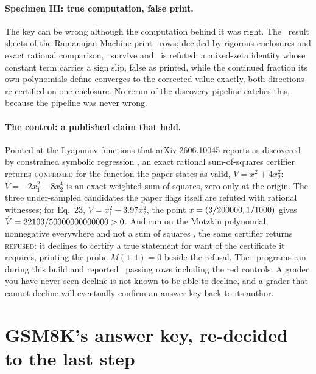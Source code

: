 \documentclass[11pt]{article}
\theoremstyle{definition}
\newcommand{\verdict}[1]{\textsc{#1}}
\begin{document}
\paragraph{Specimen III: true computation, false print.} The key can be wrong although the computation behind it was right. The \RmSheets\ result sheets of the Ramanujan Machine \cite{RM21} print \RmPrinted\ rows; decided by rigorous enclosures and exact rational comparison, \RmSurvive\ survive and \RmRefuted\ is refuted: a mixed-zeta identity whose constant term carries a sign slip, false as printed, while the continued fraction its own polynomials define converges to the corrected value exactly, both directions re-certified on one enclosure. No rerun of the discovery pipeline catches this, because the pipeline was never wrong.

\paragraph{The control: a published claim that held.} Pointed at the Lyapunov functions that arXiv:2606.10045 reports as discovered by constrained symbolic regression \cite{Lyap26}, an exact rational sum-of-squares certifier returns \verdict{confirmed} for the function the paper states as valid, $V=x_1^2+4x_2^2$: $\dot V=-2x_1^2-8x_2^4$ is an exact weighted sum of squares, zero only at the origin. The three under-sampled candidates the paper flags itself are refuted with rational witnesses; for Eq.~23, $V=x_1^2+3.97x_2^2$, the point $x=(3/200000,1/1000)$ gives $\dot V=22103/50000000000000>0$. And run on the Motzkin polynomial, nonnegative everywhere and not a sum of squares \cite{Motzkin67}, the same certifier returns \verdict{refused}: it declines to certify a true statement for want of the certificate it requires, printing the probe $M(1,1)=0$ beside the refusal. The \SosPrograms\ programs ran during this build and reported \SosPass\ passing rows including the red controls. A grader you have never seen decline is not known to be able to decline, and a grader that cannot decline will eventually confirm an answer key back to its author.

\section{GSM8K's answer key, re-decided to the last step}\label{sec:gsm8k}
\end{document}
